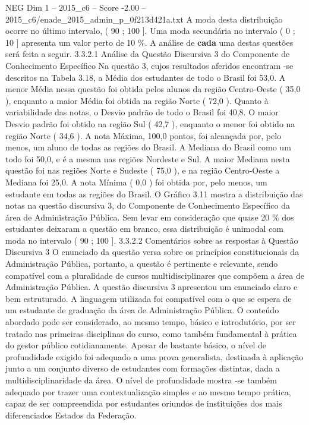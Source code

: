 \begin{textsample}{NEG Dim 1 – 2015\_c6 – Score -2.00 – 2015\_c6/enade\_2015\_admin\_p\_0f213d421a.txt}
A moda desta distribuição ocorre no último intervalo, ( 90 ; 100 ].
Uma moda secundária no intervalo ( 0 ; 10 ] apresenta um valor perto de 10 \%.
A análise de \textbf{cada} uma destas questões será feita a seguir. 3.3.2.1 Análise da Questão Discursiva 3 do Componente de Conhecimento Específico Na questão 3, cujos resultados aferidos encontram -se descritos na Tabela 3.18, a Média dos estudantes de todo o Brasil foi 53,0.
A menor Média nessa questão foi obtida pelos alunos da região Centro-Oeste ( 35,0 ), enquanto a maior Média foi obtida na região Norte ( 72,0 ).
Quanto à variabilidade das notas, o Desvio padrão de todo o Brasil foi 40,8.
O maior Desvio padrão foi obtido na região Sul ( 42,7 ), enquanto o menor foi obtido na região Norte ( 34,6 ).
A nota Máxima, 100,0 pontos, foi alcançada por, pelo menos, um aluno de todas as regiões do Brasil.
A Mediana do Brasil como um todo foi 50,0, e é a mesma nas regiões Nordeste e Sul.
A maior Mediana nesta questão foi nas regiões Norte e Sudeste ( 75,0 ), e na região Centro-Oeste a Mediana foi 25,0.
A nota Mínima ( 0,0 ) foi obtida por, pelo menos, um estudante em todas as regiões do Brasil.
O Gráfico 3.11 mostra a distribuição das notas na questão discursiva 3, do Componente de Conhecimento Específico da área de Administração Pública.
Sem levar em consideração que quase 20 \% dos estudantes deixaram a questão em branco, essa distribuição é unimodal com moda no intervalo ( 90 ; 100 ]. 3.3.2.2 Comentários sobre as respostas à Questão Discursiva 3 O enunciado da questão versa sobre os princípios constitucionais da Administração Pública, portanto, a questão é pertinente e relevante, sendo compatível com a pluralidade de cursos multidisciplinares que compõem a área de Administração Pública.
A questão discursiva 3 apresentou um enunciado claro e bem estruturado.
A linguagem utilizada foi compatível com o que se espera de um estudante de graduação da área de Administração Pública.
O conteúdo abordado pode ser considerado, ao mesmo tempo, básico e introdutório, por ser tratado nas primeiras disciplinas do curso, como também fundamental à prática do gestor público cotidianamente.
Apesar de bastante básico, o nível de profundidade exigido foi adequado a uma prova generalista, destinada à aplicação junto a um conjunto diverso de estudantes com formações distintas, dada a multidisciplinaridade da área.
O nível de profundidade mostra -se também adequado por trazer uma contextualização simples e ao mesmo tempo prática, capaz de ser compreendida por estudantes oriundos de instituições dos mais diferenciados Estados da Federação.

\end{textsample}
